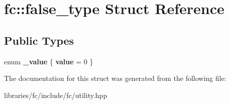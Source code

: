 \hypertarget{structfc_1_1false__type}{}\section{fc\+:\+:false\+\_\+type Struct Reference}
\label{structfc_1_1false__type}
\subsection*{Public Types}
\begin{DoxyCompactItemize}
\item 
\mbox{\label{structfc_1_1false__type_af05c8e2a1a0856798e9cce592ea10ec2}} 
enum {\bfseries \+\_\+value} \{ {\bfseries value} = 0
 \}
\end{DoxyCompactItemize}


The documentation for this struct was generated from the following file\+:\begin{DoxyCompactItemize}
\item 
libraries/fc/include/fc/utility.\+hpp\end{DoxyCompactItemize}
